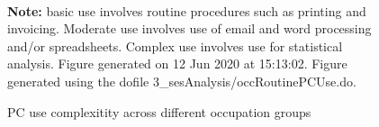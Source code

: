\begin{figure}[!h]
\caption{PC use complexitity across different occupation groups}
\label{fig:pccomparison}
  \\  
\par \begin{minipage}[h]{\textwidth}{\scriptsize\textbf{Note:} basic use involves routine procedures such as printing and invoicing. Moderate use involves use of email and word processing and/or spreadsheets. Complex use involves use for statistical analysis. Figure generated on 12 Jun 2020 at 15:13:02. Figure generated using the dofile 3\_sesAnalysis/occRoutinePCUse.do.}\end{minipage}
\end{figure}
